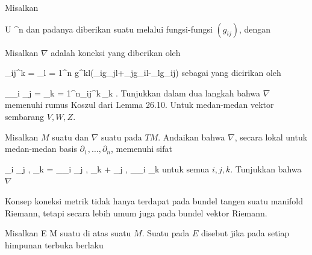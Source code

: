 {}
{

Misalkan

\mavergleichskette
{\vergleichskette
{ U
}
{ \subseteq }{ \R^n
}
{  }{
}
{    }{
}
{   }{
}
}
{}{}{}
dan padanya diberikan suatu
melalui fungsi-fungsi $\left(  g_{ij}  \right)$, dengan

 Misalkan $\nabla$ adalah koneksi yang diberikan oleh

\mavergleichskettedisp
{\vergleichskette
{ \Gamma_{ij}^k
}
{ =} { {  } \sum_{l = 1}^n g^{kl}(\partial_ig_{jl}+\partial_jg_{il}-\partial_lg_{ij})
}
{ } {
}
{ } {
}
{ } {
}
}
{}{}{}
sebagai
yang dicirikan oleh

\mavergleichskettedisp
{\vergleichskette
{ \nabla_{\partial_i } \partial_j
}
{ =} { \sum_{k = 1}^n\Gamma_{ij}^k\,\partial_k
}
{ } {
}
{ } {
}
{ } {
}
}
{}{}{.}
Tunjukkan dalam dua langkah bahwa $\nabla$ memenuhi rumus Koszul dari
Lemma 26.10.
 {Untuk medan-medan vektor sembarang $V,W,Z$.
}

}
{} {}

{}
{

Misalkan $M$ suatu
dan $\nabla$ suatu
pada $TM$. Andaikan bahwa $\nabla$, secara lokal untuk medan-medan basis $\partial_1  , \ldots , \partial_n$, memenuhi sifat

\mavergleichskettedisp
{\vergleichskette
{ \partial_i \left\langle  \partial_j  ,  \partial_k   \right\rangle
}
{ =} { \left\langle \nabla_{\partial_i } \partial_j   ,  \partial_k   \right\rangle  + \left\langle  \partial_j  ,  \nabla_{\partial_i } \partial_k    \right\rangle
}
{ } {
}
{ } {
}
{ } {
}
}
{}{}{}
untuk semua $i,j,k$. Tunjukkan bahwa $\nabla$

}
{} {}

Konsep koneksi metrik tidak hanya terdapat pada bundel tangen suatu manifold Riemann, tetapi secara lebih umum juga pada bundel vektor Riemann.

Misalkan
 { E } { M
} {}
suatu
di atas suatu
$M$. Suatu
pada $E$ disebut
jika pada setiap himpunan terbuka berlaku

